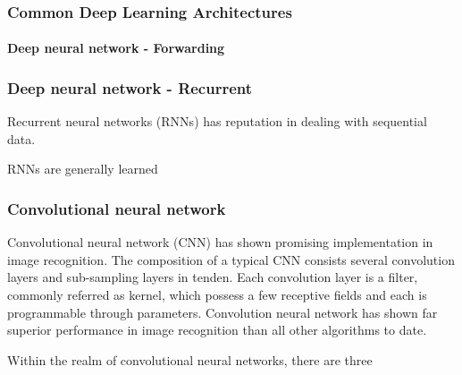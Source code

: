 \subsubsection{Common Deep Learning Architectures}

\paragraph{Deep neural network - Forwarding}
\subsubsection{Deep neural network - Recurrent}
Recurrent neural networks (RNNs) has reputation in dealing with sequential data. 

RNNs  are generally learned

\subsubsection{Convolutional neural network}
Convolutional neural network (CNN) has shown promising implementation in image recognition. The composition of a typical CNN consists several convolution layers and sub-sampling layers in tenden. Each convolution layer is a filter, commonly referred as kernel, which possess a few receptive fields and each is programmable through parameters.  
Convolution neural network has shown far superior performance in image recognition than all other algorithms to date.~\cite{Szegedy_2015}
\par 
Within the realm of convolutional neural networks, there are three